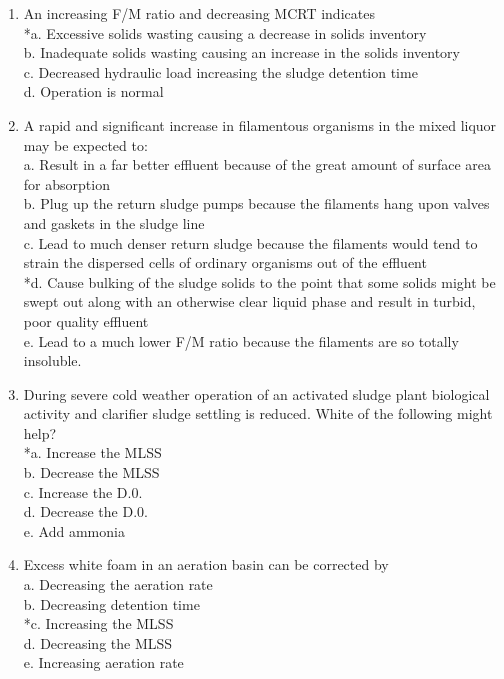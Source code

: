 \begin{enumerate}
\item An increasing F/M ratio and decreasing MCRT indicates \\
*a. Excessive solids wasting causing a decrease in solids inventory \\
b. Inadequate solids wasting causing an increase in the solids inventory \\
c. Decreased hydraulic load increasing the sludge detention time \\
d. Operation is normal \\

\item A rapid and significant increase in filamentous organisms in the mixed liquor may be expected to: \\
a. Result in a far better effluent because of the great amount of surface area for absorption \\
b. Plug up the return sludge pumps because the filaments hang upon valves and gaskets in the sludge line \\
c. Lead to much denser return sludge because the filaments would tend to strain the dispersed cells of ordinary organisms out of the effluent \\
*d. Cause bulking of the sludge solids to the point that some solids might be swept out along with an otherwise clear liquid phase and result in turbid, poor quality effluent \\
e. Lead to a much lower F/M ratio because the filaments are so totally insoluble. \\

\item During severe cold weather operation of an activated sludge plant biological activity and clarifier sludge settling is reduced. White of the following might help? \\
*a. Increase the MLSS \\
b. Decrease the MLSS \\
c. Increase the D.0. \\
d. Decrease the D.0. \\
e. Add ammonia \\

\item Excess white foam in an aeration basin can be corrected by \\
a. Decreasing the aeration rate \\
b. Decreasing detention time \\
*c. Increasing the MLSS \\
d. Decreasing the MLSS \\
e. Increasing aeration rate \\


\end{enumerate}
